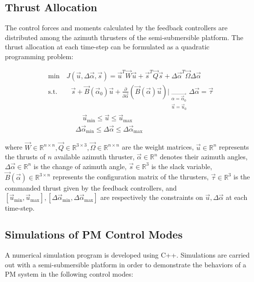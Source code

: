 \begin{sloppypar}
\subsection{Thrust Allocation}
The control forces and moments calculated by the feedback controllers are distributed among the azimuth thrusters of the semi-submersible platform. The thrust allocation at each time-step can be formulated as a quadratic programming problem:

\begin{align}
&\mathrm{min} \quad J(\vec{u}, \Delta\vec{\alpha}, \vec{s}) = \vec{u}^T\vec{W}\vec{u} + \vec{s}^T\vec{Q}\vec{s} + \Delta\vec{\alpha}^T\vec{\Omega}\Delta\vec{\alpha} \\
&\mathrm{s.t.} \qquad \vec{s} + \vec{B}(\vec{\alpha}_0)\vec{u} + \frac{\partial}{\partial \vec{\alpha}}\left( \vec{B}(\vec{\alpha})\vec{u} \right)|_{\substack{\vec{\alpha = \vec{\alpha}_0} \\ \vec{u} = \vec{u}_0}} \Delta\vec{\alpha} = \vec{\tau} \\
& \qquad \qquad \quad \vec{u}_{\mathrm{min}} \leq \vec{u} \leq \vec{u}_{\mathrm{max}} \\
& \qquad \qquad \Delta\vec{\alpha}_{\mathrm{min}} \leq \Delta\vec{\alpha} \leq \Delta\vec{\alpha}_{\mathrm{max}}
\end{align}

\noindent where $\vec{W}\in\mathbb{R}^{n\times n}, \vec{Q}\in\mathbb{R}^{3\times 3}, \vec{\Omega}\in\mathbb{R}^{n\times n}$ are the weight matrices, $\vec{u} \in \mathbb{R}^n$ represents the thrusts of $n$ available azimuth thruster, $\vec{\alpha} \in \mathbb{R}^n$ denotes their azimuth angles, $\Delta\vec{\alpha} \in \mathbb{R}^n$ is the change of azimuth angle, $\vec{s}\in\mathbb{R}^3$ is the slack variable, $\vec{B}(\vec{\alpha})\in\mathbb{R}^{3\times n}$ represents the configuration matrix of the thrusters, $\vec{\tau}\in\mathbb{R}^3$ is the commanded thrust given by the feedback controllers, and $[\vec{u}_{\mathrm{min}}, \vec{u}_{\mathrm{max}}], [\Delta\vec{\alpha}_{\mathrm{min}}, \Delta\vec{\alpha}_{\mathrm{max}}]$ are respectively the constraints on $\vec{u}, \Delta\vec{\alpha}$ at each time-step.

\subsection {Simulations of PM Control Modes}
A numerical simulation program is developed using C++. Simulations are carried out with a semi-submersible platform in order to demonstrate the behaviors of a PM system in the following control modes:


\end{sloppypar}
